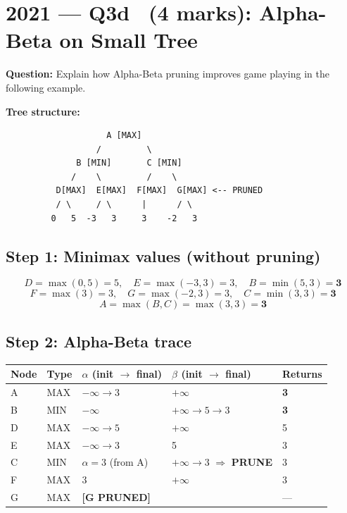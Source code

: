 \documentclass[12pt, a4paper]{article}
\newenvironment{solutionbox}{\begin{mdframed}[style=solutionframe]}{\end{mdframed}}
\newenvironment{answerbox}{\begin{mdframed}[style=answerframe]}{\end{mdframed}}
\newcommand{\pruned}[1]{\textcolor{prunered}{\textbf{[#1 PRUNED]}}}
\begin{document}
\section{2021 --- Q3d \ \normalfont(4 marks): Alpha-Beta on Small Tree}

\textbf{Question:} Explain how Alpha-Beta pruning improves game playing in the following example.

\textbf{Tree structure:}
\begin{solutionbox}
\begin{verbatim}
                    A [MAX]
                  /         \
              B [MIN]       C [MIN]
             /    \         /    \
          D[MAX]  E[MAX]  F[MAX]  G[MAX] <-- PRUNED
          / \     / \      |      / \
         0   5  -3   3     3    -2   3
\end{verbatim}
\end{solutionbox}

\subsection*{Step 1: Minimax values (without pruning)}
\[
D{=}\max(0,5){=}5,\quad E{=}\max(-3,3){=}3,\quad B{=}\min(5,3){=}\mathbf{3}
\]
\[
F{=}\max(3){=}3,\quad G{=}\max(-2,3){=}3,\quad C{=}\min(3,3){=}\mathbf{3}
\]
\[
A{=}\max(B,C){=}\max(3,3){=}\mathbf{3}
\]

\subsection*{Step 2: Alpha-Beta trace}

\begin{answerbox}
\begin{tabular}{lllll}
\toprule
\textbf{Node} & \textbf{Type} & \textbf{$\alpha$ (init $\to$ final)} & \textbf{$\beta$ (init $\to$ final)} & \textbf{Returns}\\
\midrule
A & MAX & $-\infty \to 3$ & $+\infty$ & \textbf{3}\\
B & MIN & $-\infty$ & $+\infty \to 5 \to 3$ & \textbf{3}\\
\quad D & MAX & $-\infty \to 5$ & $+\infty$ & 5\\
\quad E & MAX & $-\infty \to 3$ & 5 & 3\\
C & MIN & $\alpha{=}3$ (from A) & $+\infty \to 3$ $\Rightarrow$ \textbf{PRUNE} & 3\\
\quad F & MAX & $3$ & $+\infty$ & 3\\
\quad G & MAX & \multicolumn{2}{l}{\pruned{G}} & ---\\
\bottomrule
\end{tabular}
\end{answerbox}
\end{document}
